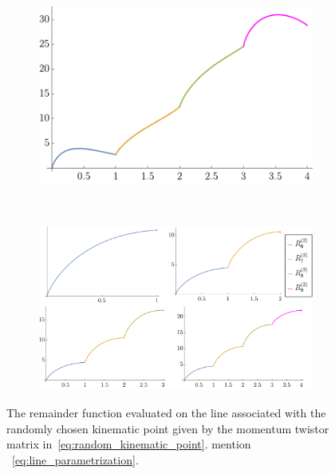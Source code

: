 \documentclass[11pt]{article}
\begin{document}
\begin{figure}[t]
\captionsetup[subfigure]{labelformat=empty}
\begin{center}
  \begin{subfigure}[b]{0.6\textwidth}
    \includegraphics[width=\textwidth]{rand_point_line.pdf}
  \end{subfigure}
\  %
  \begin{subfigure}[t]{0.1\textwidth} \vspace{-5cm}
    \includegraphics[width=\textwidth]{symmetric_lines_label.pdf}
  \end{subfigure}
    \caption{The remainder function evaluated on the line associated with the randomly chosen kinematic point given by the momentum twistor matrix in~\eqref{eq:random_kinematic_point}. mention ~\eqref{eq:line_parametrization}.}
    \label{fig:random_point_to_collinear_lines}
\end{center}
\end{figure}
\end{document}

